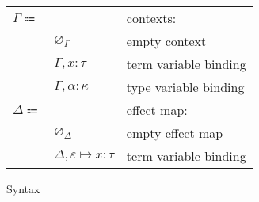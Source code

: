 \documentclass[12pt]{article}
\newcommand\anno[2]{#1 : #2}
\newcommand\evar{x}
\newcommand\type{\tau}
\newcommand\tvar{\alpha}
\newcommand\effect{\varepsilon}
\newcommand\kind{\kappa}
\newcommand\context{\Gamma}
\newcommand\cempty{\varnothing_{\context}}
\newcommand\cextend[2]{#1, #2}
\newcommand\effectMap{\Delta}
\newcommand\emempty{\varnothing_{\effectMap}}
\newcommand\emmap[2]{#1 \mapsto #2}
\newcommand\emextend[2]{#1, #2}
\begin{document}
\begin{figure}
\begin{mdframed}[backgroundcolor=none]
\begin{center}
\begin{tabular}{l l l}
          $\context \Coloneqq$ & & contexts: \\
          & $\cempty$ & empty context \\
          & $\cextend{\context}{\anno{\evar}{\type}}$ & term variable binding \\
          & $\cextend{\context}{\anno{\tvar}{\kind}}$ & type variable binding \\
          $\effectMap \Coloneqq$ & & effect map: \\
          & $\emempty$ & empty effect map \\
          & $\emextend{\effectMap}{\emmap{\effect}{\anno{\evar}{\type}}}$ & term variable binding \\
        \end{tabular}
      \end{center}

      \caption{Syntax}\label{fig:syntax}
    \end{mdframed}
  \end{figure}
\end{document}
